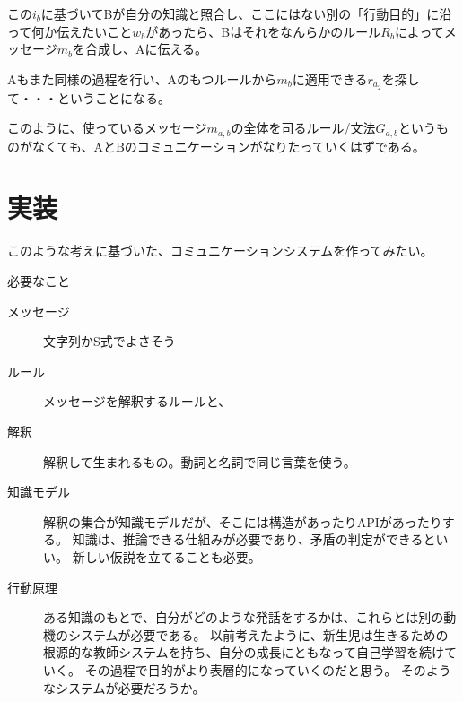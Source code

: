 \documentclass[10pt, oneside]{jarticle}   	%
\begin{document}
この$i_b$に基づいてBが自分の知識と照合し、ここにはない別の「行動目的」に沿って何か伝えたいこと$w_b$があったら、Bはそれをなんらかのルール$R_b$によってメッセージ$m_b$を合成し、Aに伝える。

Aもまた同様の過程を行い、Aのもつルールから$m_b$に適用できる$r_{a_2}$を探して・・・ということになる。

このように、使っているメッセージ$m_{a,b}$の全体を司るルール/文法$G_{a,b}$というものがなくても、AとBのコミュニケーションがなりたっていくはずである。



\section{実装}
このような考えに基づいた、コミュニケーションシステムを作ってみたい。

必要なこと
\begin{description}
\item[ メッセージ] 文字列かS式でよさそう
\item[ ルール]メッセージを解釈するルールと、
\item[ 解釈]解釈して生まれるもの。動詞と名詞で同じ言葉を使う。
\item[ 知識モデル] 解釈の集合が知識モデルだが、そこには構造があったりAPIがあったりする。
知識は、推論できる仕組みが必要であり、矛盾の判定ができるといい。
新しい仮説を立てることも必要。
\item[ 行動原理]ある知識のもとで、自分がどのような発話をするかは、これらとは別の動機のシステムが必要である。
以前考えたように、新生児は生きるための根源的な教師システムを持ち、自分の成長にともなって自己学習を続けていく。
その過程で目的がより表層的になっていくのだと思う。
そのようなシステムが必要だろうか。
\item[ ]
\end{description}
\end{document}
